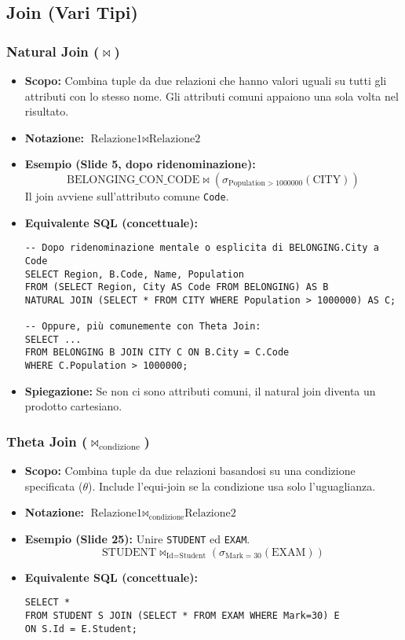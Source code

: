 \subsection{Join (Vari Tipi)}

\subsubsection{\texorpdfstring{Natural Join ($\Join$)}{Natural Join (Join)}}
\begin{itemize}
    \item \textbf{Scopo:} Combina tuple da due relazioni che hanno valori uguali su tutti gli attributi con lo stesso nome. Gli attributi comuni appaiono una sola volta nel risultato.
    \item \textbf{Notazione:} $\text{Relazione1} \Join \text{Relazione2}$
    \item \textbf{Esempio (Slide 5, dopo ridenominazione):}
          \[ \text{BELONGING\_CON\_CODE} \Join (\sigma_{\text{Population}>1000000}(\text{CITY})) \]
          Il join avviene sull'attributo comune \texttt{Code}.
    \item \textbf{Equivalente SQL (concettuale):}
\begin{verbatim}
-- Dopo ridenominazione mentale o esplicita di BELONGING.City a Code
SELECT Region, B.Code, Name, Population
FROM (SELECT Region, City AS Code FROM BELONGING) AS B
NATURAL JOIN (SELECT * FROM CITY WHERE Population > 1000000) AS C;

-- Oppure, più comunemente con Theta Join:
SELECT ...
FROM BELONGING B JOIN CITY C ON B.City = C.Code
WHERE C.Population > 1000000;
\end{verbatim}
    \item \textbf{Spiegazione:} Se non ci sono attributi comuni, il natural join diventa un prodotto cartesiano.
\end{itemize}

\subsubsection{\texorpdfstring{Theta Join ($\Join_{\text{condizione}}$)}{Theta Join (Join[condizione])}}
\begin{itemize}
    \item \textbf{Scopo:} Combina tuple da due relazioni basandosi su una condizione specificata ($\theta$). Include l'equi-join se la condizione usa solo l'uguaglianza.
    \item \textbf{Notazione:} $\text{Relazione1} \Join_{\text{condizione}} \text{Relazione2}$
    \item \textbf{Esempio (Slide 25):} Unire \texttt{STUDENT} ed \texttt{EXAM}.
          \[ \text{STUDENT} \Join_{\text{Id}=\text{Student}} (\sigma_{\text{Mark}=30}(\text{EXAM})) \]
    \item \textbf{Equivalente SQL (concettuale):}
\begin{verbatim}
SELECT *
FROM STUDENT S JOIN (SELECT * FROM EXAM WHERE Mark=30) E
ON S.Id = E.Student;
\end{verbatim}
\end{itemize}

